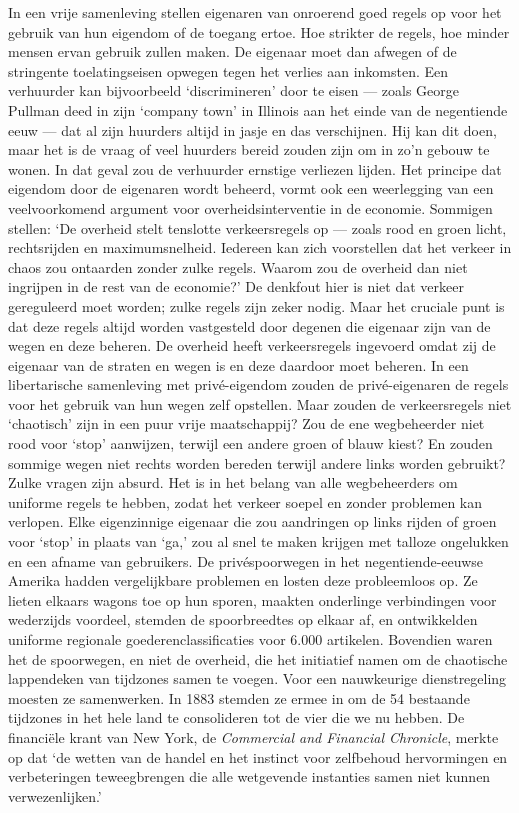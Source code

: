 \documentclass[
  a5paper,
  smalldemyvopaper,10pt,twoside,onecolumn,openright,extrafontsizes,hidelinks]{memoir}
\begin{document}
In een vrije samenleving stellen eigenaren van onroerend goed regels op
voor het gebruik van hun eigendom of de toegang ertoe. Hoe strikter de
regels, hoe minder mensen ervan gebruik zullen maken. De eigenaar moet
dan afwegen of de stringente toelatingseisen opwegen tegen het verlies
aan inkomsten. Een verhuurder kan bijvoorbeeld `discrimineren' door te
eisen --- zoals George Pullman deed in zijn `company town' in Illinois
aan het einde van de negentiende eeuw --- dat al zijn huurders altijd in
jasje en das verschijnen. Hij kan dit doen, maar het is de vraag of veel
huurders bereid zouden zijn om in zo'n gebouw te wonen. In dat geval zou
de verhuurder ernstige verliezen lijden. Het principe dat eigendom door
de eigenaren wordt beheerd, vormt ook een weerlegging van een
veelvoorkomend argument voor overheidsinterventie in de economie.
Sommigen stellen: `De overheid stelt tenslotte verkeersregels op ---
zoals rood en groen licht, rechtsrijden en maximumsnelheid. Iedereen kan
zich voorstellen dat het verkeer in chaos zou ontaarden zonder zulke
regels. Waarom zou de overheid dan niet ingrijpen in de rest van de
economie?' De denkfout hier is niet dat verkeer gereguleerd moet worden;
zulke regels zijn zeker nodig. Maar het cruciale punt is dat deze regels
altijd worden vastgesteld door degenen die eigenaar zijn van de wegen en
deze beheren. De overheid heeft verkeersregels ingevoerd omdat zij de
eigenaar van de straten en wegen is en deze daardoor moet beheren. In
een libertarische samenleving met privé-eigendom zouden de
privé-eigenaren de regels voor het gebruik van hun wegen zelf opstellen.
Maar zouden de verkeersregels niet `chaotisch' zijn in een puur vrije
maatschappij? Zou de ene wegbeheerder niet rood voor `stop' aanwijzen,
terwijl een andere groen of blauw kiest? En zouden sommige wegen niet
rechts worden bereden terwijl andere links worden gebruikt? Zulke vragen
zijn absurd. Het is in het belang van alle wegbeheerders om uniforme
regels te hebben, zodat het verkeer soepel en zonder problemen kan
verlopen. Elke eigenzinnige eigenaar die zou aandringen op links rijden
of groen voor `stop' in plaats van `ga,' zou al snel te maken krijgen
met talloze ongelukken en een afname van gebruikers. De privéspoorwegen
in het negentiende-eeuwse Amerika hadden vergelijkbare problemen en
losten deze probleemloos op. Ze lieten elkaars wagons toe op hun sporen,
maakten onderlinge verbindingen voor wederzijds voordeel, stemden de
spoorbreedtes op elkaar af, en ontwikkelden uniforme regionale
goederenclassificaties voor 6.000 artikelen. Bovendien waren het de
spoorwegen, en niet de overheid, die het initiatief namen om de
chaotische lappendeken van tijdzones samen te voegen. Voor een
nauwkeurige dienstregeling moesten ze samenwerken. In 1883 stemden ze
ermee in om de 54 bestaande tijdzones in het hele land te consolideren
tot de vier die we nu hebben. De financiële krant van New York, de
\emph{Commercial and Financial Chronicle}, merkte op dat `de wetten van
de handel en het instinct voor zelfbehoud hervormingen en verbeteringen
teweegbrengen die alle wetgevende instanties samen niet kunnen
verwezenlijken.'
\end{document}
